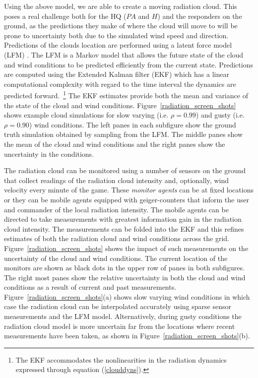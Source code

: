 Using the above model, we are able to create a moving radiation cloud. This poses a real challenge both for the HQ ($PA$ and $H$) and the responders on the ground, as the predictions they make of where the cloud will move to will be prone to uncertainty both due to the simulated wind speed and direction.  Predictions of the clouds location are performed using a latent force model (LFM) \cite{reece10,reece14}.  The LFM is a Markov model that allows the future state of the cloud and wind conditions to be predicted efficiently from the current state.  Predictions are computed using the Extended Kalman filter (EKF) which has a linear computational complexity with regard to the time interval the dynamics are predicted forward.~\footnote{The EKF accommodates the nonlinearities in the radiation dynamics expressed through equation (\ref{clouddyns}).}  The EKF estimates provide both the mean and variance of the state of the cloud and wind conditions.  Figure~\ref{radiation_screen_shots} shows example cloud simulations for slow varying (i.e. $\rho=0.99$) and gusty (i.e. $\rho=0.90$) wind conditions.  The left panes in each subfigure show the ground truth simulation obtained by sampling from the LFM.  The middle panes show the mean of the cloud and wind conditions and the right panes show the uncertainty in the conditions.

The radiation cloud can be monitored using a number of sensors on the ground that collect readings of the radiation cloud intensity and, optionally, wind velocity every minute of the game. These {\it monitor agents} can be at fixed locations or they can be mobile agents equipped with geiger-counters that inform the user and commander of the local radiation intensity.  The mobile agents can be directed to take measurements with greatest information gain in the radiation cloud intensity.  The measurements can be folded into the EKF and this refines estimates of both the radiation cloud and wind conditions across the grid.  Figure~\ref{radiation_screen_shots} shows the impact of such measurements on the uncertainty of the cloud and wind conditions.  The current location of the monitors are shown as black dots in the upper row of panes in both subfigures.  The right most panes show the relative uncertainty in both the cloud and wind conditions as a result of current and past measurements.  Figure~\ref{radiation_screen_shots}(a) shows slow varying wind conditions in which case the radiation cloud can be interpolated accurately using sparse sensor measurements and the LFM model.  Alternatively, during gusty conditions the radiation cloud model is more uncertain far from the locations where recent measurements have been taken, as shown in Figure~\ref{radiation_screen_shots}(b).

